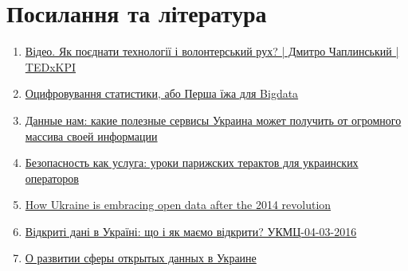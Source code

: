 \chapter{Посилання та література}
\label{sec:links-and-literature}

\begin{enumerate}
\item \href{https://www.youtube.com/watch?v=nR9CXA6_7-I}{Відео. Як поєднати технології і волонтерський рух? | Дмитро Чаплинський | TEDxKPI}
\item \href{http://www.epravda.com.ua/publications/2015/08/20/554624}{Оцифровування статистики, або Перша їжа для Bigdata}
\item \href{http://platfor.ma/magazine/text-sq/projects/open-data-incubator/}{Данные нам: какие полезные сервисы Украина может получить от огромного массива своей информации}
\item \href{http://itc.ua/articles/bezopasnost-kak-usluga-uroki-parizhskih-teraktov-dlya-ukrainskih-operatorov}{Безопасность как услуга: уроки парижских терактов для украинских операторов}
\item \href{http://theodi.org/blog/ukraine-embracing-open-data-2014-revolution}{How Ukraine is embracing open data after the 2014 revolution}
\item \href{https://www.youtube.com/watch?v=gyHEOpX1yes}{Відкриті дані в Україні: що і як маємо відкрити? УКМЦ-04-03-2016}
\item \href{https://habrahabr.ru/post/306414/}{О развитии сферы открытых данных в Украине}
\end{enumerate}